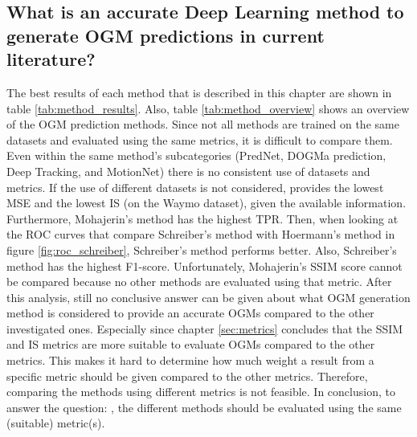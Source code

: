 \subsection{What is an accurate Deep Learning method to generate \gls{OGM} predictions in current literature?} \label{subsec:con_method}
The best results of each method that is described in this chapter are shown in table \ref{tab:method_results}. Also, table \ref{tab:method_overview} shows an overview of the \gls{OGM} prediction methods. Since not all methods are trained on the same datasets and evaluated using the same metrics, it is difficult to compare them. Even within the same method's subcategories (PredNet, \gls{DOGMa} prediction, Deep Tracking, and MotionNet) there is no consistent use of datasets and metrics. If the use of different datasets is not considered, \cite{lange2020attention} provides the lowest \gls{MSE} and the lowest \gls{IS} (on the Waymo \cite{sun2020scalability} dataset), given the available information. Furthermore, Mohajerin's \cite{mohajerin2019multi} method has the highest \gls{TPR}. Then, when looking at the \gls{ROC} curves that compare Schreiber's method \cite{schreiber2019long} with Hoermann's method \cite{hoermann2018dynamic} in figure \ref{fig:roc_schreiber}, Schreiber's method \cite{schreiber2019long} performs better. Also, Schreiber's method \cite{schreiber2019long} has the highest F1-score. Unfortunately, Mohajerin's \cite{mohajerin2019multi} \gls{SSIM} score cannot be compared because no other methods are evaluated using that metric. After this analysis, still no conclusive answer can be given about what \gls{OGM} generation method is considered to provide an accurate \glspl{OGM} compared to the other investigated ones. Especially since chapter \ref{sec:metrics} concludes that the \gls{SSIM} and \gls{IS} metrics are more suitable to evaluate \glspl{OGM} compared to the other metrics. This makes it hard to determine how much weight a result from a specific metric should be given compared to the other metrics. Therefore, comparing the methods using different metrics is not feasible. In conclusion, to answer the question: , the different methods should be evaluated using the same (suitable) metric(s). 

